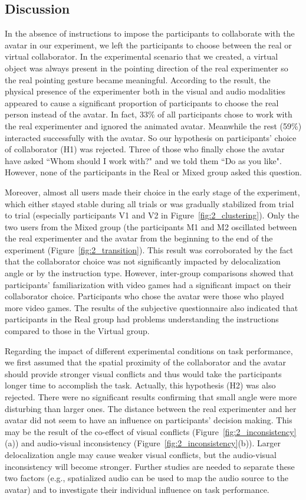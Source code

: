 \subsection{Discussion}
In the absence of instructions to impose the participants to collaborate with the avatar in our experiment, we left the participants to choose between the real or virtual collaborator. In the experimental scenario that we created, a virtual object was always present in the pointing direction of the real experimenter so the real pointing gesture became meaningful. According to the result, the physical presence of the experimenter both in the visual and audio modalities appeared to cause a significant proportion of participants to choose the real person instead of the avatar. In fact, 33\% of all participants chose to work with the real experimenter and ignored the animated avatar. Meanwhile the rest (59\%) interacted successfully with the avatar. So our hypothesis on participants' choice of collaborator (H1) was rejected. Three of those who finally chose the avatar have asked ``Whom should I work with?" and we told them ``Do as you like". However, none of the participants in the Real or Mixed group asked this question.

Moreover, almost all users made their choice in the early stage of the experiment, which either stayed stable during all trials or was gradually stabilized from trial to trial (especially participants V1 and V2 in Figure~\ref{fig:2_clustering}). Only the two users from the Mixed group (the participants M1 and M2 oscillated between the real experimenter and the avatar from the beginning to the end of the experiment (Figure~\ref{fig:2_transition}). This result was corroborated by the fact that the collaborator choice was not significantly impacted by delocalization angle or by the instruction type. However, inter-group comparisons showed that participants' familiarization with video games had a significant impact on their collaborator choice. Participants who chose the avatar were those who played more video games. The results of the subjective questionnaire also indicated that participants in the Real group had problems understanding the instructions compared to those in the Virtual group.

Regarding the impact of different experimental conditions on task performance, we first assumed that the spatial proximity of the collaborator and the avatar should provide stronger visual conflicts and thus would take the participants longer time to accomplish the task. Actually, this hypothesis (H2) was also rejected. There were no significant results confirming that small angle were more disturbing than larger ones. The distance between the real experimenter and her avatar did not seem to have an influence on participants' decision making. This may be the result of the co-effect of visual conflicts (Figure~\ref{fig:2_inconsistency}(a)) and audio-visual inconsistency (Figure~\ref{fig:2_inconsistency}(b)). Larger delocalization angle may cause weaker visual conflicts, but the audio-visual inconsistency will become stronger. Further studies are needed to separate these two factors (e.g., spatialized audio can be used to map the audio source to the avatar) and to investigate their individual influence on task performance.

